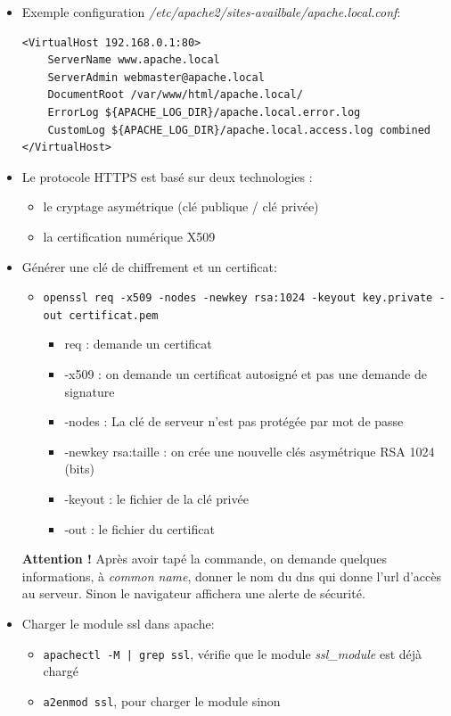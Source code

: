 \documentclass[a4paper]{article}
\begin{document}
\begin{itemize}
\item Exemple configuration \textit{/etc/apache2/sites-availbale/apache.local.conf}:
\begin{verbatim}
<VirtualHost 192.168.0.1:80>
    ServerName www.apache.local
    ServerAdmin webmaster@apache.local
    DocumentRoot /var/www/html/apache.local/
    ErrorLog ${APACHE_LOG_DIR}/apache.local.error.log
    CustomLog ${APACHE_LOG_DIR}/apache.local.access.log combined
</VirtualHost>
\end{verbatim}

\item Le protocole HTTPS est basé sur deux technologies :
\begin{itemize}
    \item le cryptage asymétrique (clé publique / clé privée)
    \item la certification numérique X509
\end{itemize}

\item Générer une clé de chiffrement et un certificat:
\begin{itemize}
    \item \texttt{openssl req -x509 -nodes -newkey rsa:1024 -keyout key.private -out certificat.pem}
    \begin{itemize}
        \item req : demande un certificat
        \item -x509 : on demande un certificat autosigné et pas une demande de signature
        \item -nodes : La clé de serveur n’est pas protégée par mot de passe
        \item -newkey rsa:taille : on crée une nouvelle clés asymétrique RSA 1024 (bits)
        \item -keyout : le fichier de la clé privée
        \item -out : le fichier du certificat
    \end{itemize}
\end{itemize}
\textbf{Attention !} Après avoir tapé la commande, on demande quelques informations, à \textit{common name}, donner le nom du dns qui donne l'url d'accès au serveur. Sinon le navigateur affichera une alerte de sécurité.

\item Charger le module ssl dans apache:
\begin{itemize}
    \item \texttt{apachectl -M | grep ssl}, vérifie que le module \textit{ssl\_module} est déjà chargé
    \item \texttt{a2enmod ssl}, pour charger le module sinon
\end{itemize}


\end{itemize}
\end{document}
